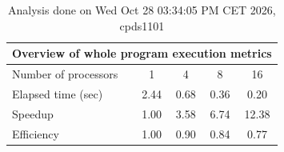 \begin{table}[h]
\begin{center}
\begin{tabular}{|l|c|c|c|c|}
\hline
\multicolumn{5}{|c|}{Overview of whole program execution metrics} \\
\hline
\hline
Number of processors & 1 & 4 & 8 & 16 \\
\hline
Elapsed time (sec)      &       2.44 &       0.68 &       0.36 &       0.20 \\
\hline
Speedup                 &       1.00 &       3.58 &       6.74 &      12.38 \\
\hline
Efficiency              &       1.00 &       0.90 &       0.84 &       0.77 \\
\hline
\end{tabular}
\end{center}
\caption{ Analysis done on Wed Oct 28 03:34:05 PM CET 2026, cpds1101}
\end{table}
